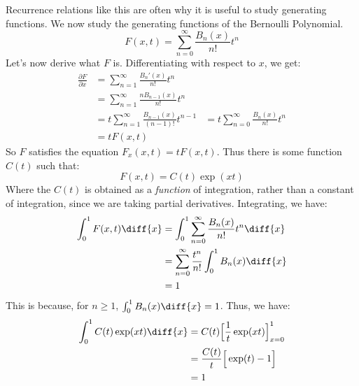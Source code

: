            Recurrence relations like this are often why it is
            useful to study generating functions. We now study
            the generating functions of the Bernoulli Polynomial.
            \begin{equation}
                F(x,t)=\sum_{n=0}^{\infty}
                \frac{B_{n}(x)}{n!}t^{n}
            \end{equation}
            Let's now derive what $F$ is. Differentiating with
            respect to $x$, we get:
            \begin{align}
                \frac{\partial{F}}{\partial{x}}
                &=\sum_{n=1}^{\infty}
                \frac{B_{n}'(x)}{n!}t^{n}\\
                &=\sum_{n=1}^{\infty}
                    \frac{nB_{n-1}(x)}{n!}t^{n}\\
                &=t\sum_{n=1}^{\infty}
                    \frac{B_{n-1}(x)}{(n-1)!}t^{n-1}
                &=t\sum_{n=0}^{\infty}
                    \frac{B_{n}(x)}{n!}t^{n}\\
                &=tF(x,t)
            \end{align}
            So $F$ satisfies the equation $F_{x}(x,t)=tF(x,t)$.
            Thus there is some function $C(t)$ such that:
            \begin{equation}
                F(x,t)=C(t)\exp(xt)
            \end{equation}
            Where the $C(t)$ is obtained as a \textit{function}
            of integration, rather than a constant of integration,
            since we are taking partial derivatives. Integrating,
            we have:
            \begin{align}
                \int_{0}^{1}F(x,t)\diff{x}
                &=\int_{0}^{1}\sum_{n=0}^{\infty}
                    \frac{B_{n}(x)}{n!}t^{n}\diff{x}\\
                &=\sum_{n=0}^{\infty}\frac{t^{n}}{n!}
                \int_{0}^{1}B_{n}(x)\diff{x}\\
                &=1
            \end{align}
            This is because, for $n\geq{1}$,
            $\int_{0}^{1}B_{n}(x)\diff{x}=1$. Thus, we have:
            \begin{align}
                \int_{0}^{1}C(t)\exp(xt)\diff{x}&=
                C(t)\Big[\frac{1}{t}\exp(xt)\Big]_{x=0}^{1}\\
                &=\frac{C(t)}{t}\Big[\exp(t)-1\Big]\\
                &=1
            \end{align}
